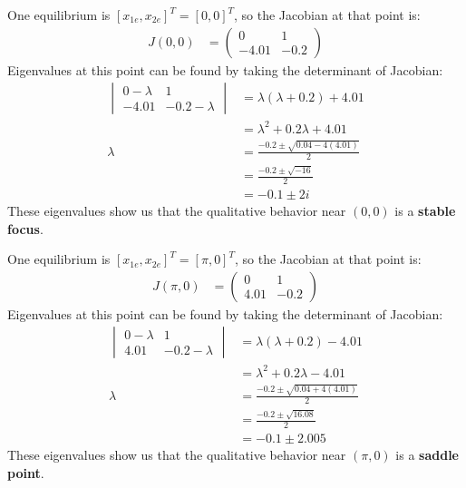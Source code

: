 \documentclass[12pt]{article}
\begin{document}
\noindent One equilibrium is $[x_{1e}, x_{2e}]^T = [0, 0]^T$, so the Jacobian at that point is:
	\begin{align*}
		J(0,0) &= 
		\begin{pmatrix}
			0 & 1 \\
			-4.01 & -0.2
		\end{pmatrix}
	\end{align*}
Eigenvalues at this point can be found by taking the determinant of Jacobian:
	\begin{align*}
		\begin{vmatrix}
			0 - \lambda & 1 \\
			-4.01 & -0.2 - \lambda			
		\end{vmatrix}
		&= \lambda(\lambda + 0.2) + 4.01 \\
		&= \lambda^2 + 0.2\lambda + 4.01 \\
		\lambda &= \frac{-0.2 \pm \sqrt{0.04 - 4(4.01)}}{2} \\
		&= \frac{-0.2 \pm \sqrt{-16}}{2} \\
		&= -0.1 \pm 2i	
	\end{align*}
These eigenvalues show us that the qualitative behavior near $(0,0)$ is a \textbf{stable focus}.

\vspace{\baselineskip}
\vspace{\baselineskip}

\noindent One equilibrium is $[x_{1e}, x_{2e}]^T = [\pi, 0]^T$, so the Jacobian at that point is:
\begin{align*}
J(\pi,0) &= 
\begin{pmatrix}
0 & 1 \\
4.01 & -0.2
\end{pmatrix}
\end{align*}
Eigenvalues at this point can be found by taking the determinant of Jacobian:
\begin{align*}
\begin{vmatrix}
0 - \lambda & 1 \\
4.01 & -0.2 - \lambda			
\end{vmatrix}
&= \lambda(\lambda + 0.2) - 4.01 \\
&= \lambda^2 + 0.2\lambda - 4.01 \\
\lambda &= \frac{-0.2 \pm \sqrt{0.04 + 4(4.01)}}{2} \\
&= \frac{-0.2 \pm \sqrt{16.08}}{2} \\
&= -0.1 \pm 2.005
\end{align*}
These eigenvalues show us that the qualitative behavior near $(\pi,0)$ is a \textbf{saddle point}.
\end{document}
